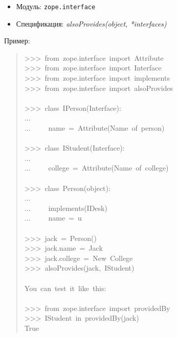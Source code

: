 \documentclass[a4paper,openany,twoside,final]{book}
\providecommand*{\DUroletitlereference}[1]{\textsl{#1}}
\begin{document}
\begin{itemize}

\item Модуль: \texttt{zope.interface}

\item Спецификация: \DUroletitlereference{alsoProvides(object, *interfaces)}

\end{itemize}

Пример:

\begin{quote}{\ttfamily \raggedright \noindent
>{}>{}>~from~zope.interface~import~Attribute\\
>{}>{}>~from~zope.interface~import~Interface\\
>{}>{}>~from~zope.interface~import~implements\\
>{}>{}>~from~zope.interface~import~alsoProvides\\
~\\
>{}>{}>~class~IPerson(Interface):\\
...\\
...~~~~~name~=~Attribute(\textquotedbl{}Name~of~person\textquotedbl{})\\
~\\
>{}>{}>~class~IStudent(Interface):\\
...\\
...~~~~~college~=~Attribute(\textquotedbl{}Name~of~college\textquotedbl{})\\
~\\
>{}>{}>~class~Person(object):\\
...\\
...~~~~~implements(IDesk)\\
...~~~~~name~=~u\textquotedbl{}\textquotedbl{}\\
~\\
>{}>{}>~jack~=~Person()\\
>{}>{}>~jack.name~=~\textquotedbl{}Jack\textquotedbl{}\\
>{}>{}>~jack.college~=~\textquotedbl{}New~College\textquotedbl{}\\
>{}>{}>~alsoProvides(jack,~IStudent)\\
~\\
You~can~test~it~like~this:\\
~\\
>{}>{}>~from~zope.interface~import~providedBy\\
>{}>{}>~IStudent~in~providedBy(jack)\\
True
}
\end{quote}
\end{document}
